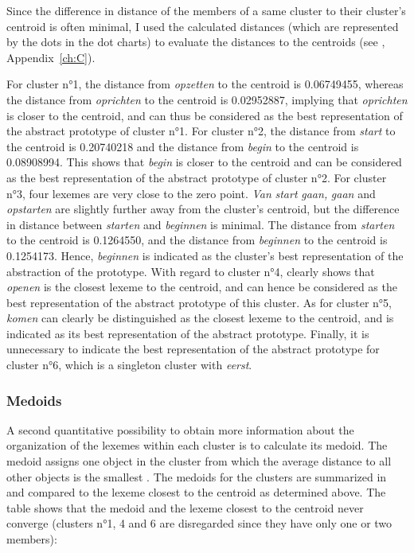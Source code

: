 Since the difference in distance of the members of a same cluster to their cluster’s centroid is often minimal, I used the calculated distances (which are represented by the dots in the dot charts) to evaluate the distances to the centroids (see , Appendix~\ref{ch:C}).

For cluster n°1, the distance from \textit{opzetten} to the centroid is 0.06749455, whereas the distance from \textit{oprichten} to the centroid is 0.02952887, implying that \textit{oprichten} is closer to the centroid, and can thus be considered as the best representation of the abstract prototype of cluster n°1. For cluster n°2, the distance from \textit{start} to the centroid is 0.20740218 and the distance from \textit{begin} to the centroid is 0.08908994. This shows that \textit{begin} is closer to the centroid and can be considered as the best representation of the abstract prototype of cluster n°2. For cluster n°3, four lexemes are very close to the zero point. \textit{Van} \textit{start} \textit{gaan,} \textit{gaan} and \textit{opstarten} are slightly further away from the cluster’s centroid, but the difference in distance between \textit{starten} and \textit{beginnen} is minimal. The distance from \textit{starten} to the centroid is 0.1264550, and the distance from \textit{beginnen} to the centroid is 0.1254173. Hence, \textit{beginnen} is indicated as the cluster’s best representation of the abstraction of the prototype. With regard to cluster n°4,  clearly shows that \textit{openen} is the closest lexeme to the centroid, and can hence be considered as the best representation of the abstract prototype of this cluster. As for cluster n°5, \textit{komen} can clearly be distinguished as the closest lexeme to the centroid, and is indicated as its best representation of the abstract prototype. Finally, it is unnecessary to indicate the best representation of the abstract prototype for cluster n°6, which is a singleton cluster with \textit{eerst}.

\subsubsection{Medoids}
\label{sec:4.2.3.2}  
A second quantitative possibility to obtain more information about the organization of the lexemes within each cluster is to calculate its medoid. The medoid assigns one object in the cluster from which the average distance to all other objects is the smallest \citep[164]{divjak_structuring_2010}. The medoids for the clusters are summarized in  and compared to the lexeme closest to the centroid as determined above. The table shows that the medoid and the lexeme closest to the centroid never converge (clusters n°1, 4 and 6 are disregarded since they have only one or two members):

